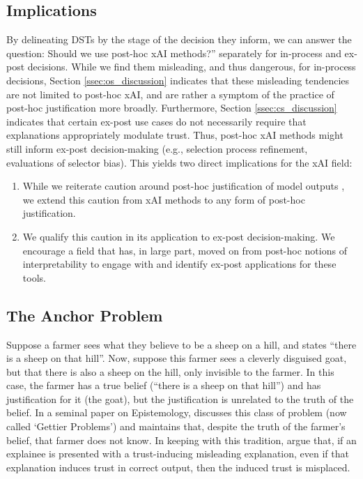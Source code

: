 \subsection{Implications}
By delineating DSTs by the stage of the decision they inform, we can answer the question: Should we use post-hoc xAI methods?'' separately for in-process and ex-post decisions. While we find them misleading, and thus dangerous, for in-process decisions, Section \ref{ssec:os_discussion} indicates that these misleading tendencies are not limited to post-hoc xAI, and are rather a symptom of the practice of post-hoc justification more broadly. Furthermore, Section \ref{ssec:cs_discussion} indicates that certain ex-post use cases do not necessarily require that explanations appropriately modulate trust. Thus, post-hoc xAI methods might still inform ex-post decision-making (e.g., selection process refinement, evaluations of selector bias). This yields two direct implications for the xAI field:

\begin{enumerate}
    \item While we reiterate caution around post-hoc justification of model outputs \cite{miller_explainable_2023, Lipton, bansal_does_2021, ford_play_2020, jacobs_how_2021}, we extend this caution from xAI methods to any form of post-hoc justification.
    \item We qualify this caution in its application to ex-post decision-making. We encourage a field that has, in large part, moved on from post-hoc notions of interpretability \cite{kumar_problems_2020,barocas_hidden_2020,Lipton,karimi_algorithmic_2021} to engage with and identify ex-post applications for these tools.
\end{enumerate}

\subsection{The Anchor Problem}\label{ssec:anchor_problem}


Suppose a farmer sees what they believe to be a sheep on a hill, and states ``there is a sheep on that hill''. Now, suppose this farmer sees a cleverly disguised goat, but that there is also a sheep on the hill, only invisible to the farmer. In this case, the farmer has a true belief (``there is a sheep on that hill'') and has justification for it (the goat), but the justification is unrelated to the truth of the belief. In a seminal paper on Epistemology, \textcite{Gettier_1963} discusses this class of problem (now called `Gettier Problems') and maintains that, despite the truth of the farmer's belief, that farmer does not know. In keeping with this tradition, \textcite{Cabitza_Fregosi_Campagner_Natali_2024} argue that, if an explainee is presented with a trust-inducing misleading explanation, even if that explanation induces trust in correct output, then the induced trust is misplaced.

